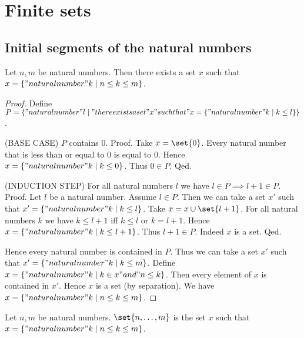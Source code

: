 \documentclass[../../tuples-and-cartesian-products.ftl.tex]{subfiles}
\begin{document}


  \section{Finite sets}

  \subsection{Initial segments of the natural numbers}

  \begin{forthel}
    \begin{lemma}
      Let $n,m$ be natural numbers.
      Then there exists a set $x$ such that $x = \{ "natural number" k \mid n \leq k \leq m \}$.
    \end{lemma}
    \begin{proof}
      Define $P = \{ "natural number" l \mid "there exists a set" x "such that" x = \{ "natural number" k \mid k \leq l \} \}$.

      (BASE CASE) $P$ contains $0$.
      Proof.
        Take $x = \set{0}$.
        Every natural number that is less than or equal to $0$ is equal to $0$.
        Hence $x = \{ "natural number" k \mid k \leq 0 \}$.
        Thus $0 \in P$.
      Qed.

      (INDUCTION STEP) For all natural numbers $l$ we have $l \in P \implies l + 1 \in P$. \\
      Proof.
        Let $l$ be a natural number.
        Assume $l \in P$.
        Then we can take a set $x'$ such that $x' = \{ "natural number" k \mid k \leq l \}$.
        Take $x = x \cup \set{l + 1}$.
        For all natural numbers $k$ we have $k \leq l + 1$ iff $k \leq l$ or $k = l + 1$.
        Hence $x = \{ "natural number" k \mid k \leq l + 1 \}$.
        Thus $l + 1 \in P$.
        Indeed $x$ is a set.
      Qed.

      Hence every natural number is contained in $P$.
      Thus we can take a set $x'$ such that $x' = \{ "natural number" k \mid k \leq m \}$.
      Define $x = \{ "natural number" k \mid k \in x "and" n \leq k \}$.
      Then every element of $x$ is contained in $x'$.
      Hence $x$ is a set (by separation).
      We have $x = \{ "natural number" k \mid n \leq k \leq m \}$.
    \end{proof}

    \begin{definition}
      Let $n,m$ be natural numbers.
      $\set{n, \dots, m}$ is the set $x$ such that $x = \{ "natural number" k \mid n \leq k \leq m \}$.
    \end{definition}
  \end{forthel}
\end{document}
